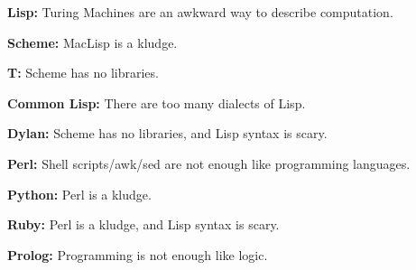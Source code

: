 \textbf{Lisp:} Turing Machines
                    are an awkward way to describe computation.

\textbf{Scheme:}
                    MacLisp is a kludge.

\textbf{T:} Scheme has no
                    libraries.

\textbf{Common Lisp:} There are too many
                    dialects of Lisp.

\textbf{Dylan:} Scheme has no
                    libraries, and Lisp syntax is scary.


                    \textbf{Perl:} Shell scripts/awk/sed are not enough like
                    programming languages.

\textbf{Python:} Perl is a
                    kludge.

\textbf{Ruby:} Perl is a kludge, and Lisp
                    syntax is scary.

\textbf{Prolog:} Programming is
                    not enough like logic.




                    



              
            
          
